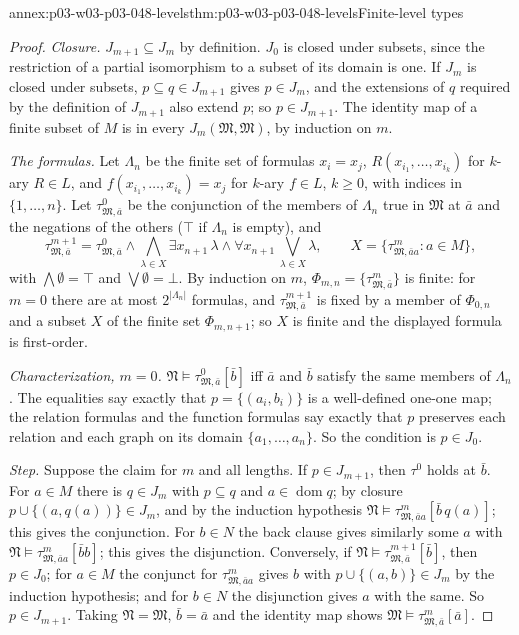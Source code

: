 \begin{annexitem}{annex:p03-w03-p03-048-levels}{thm:p03-w03-p03-048-levels}{Finite-level types}
\begin{proof}
\emph{Closure.}  \(J_{m+1}\subseteq J_m\) by definition.  \(J_0\) is closed
under subsets, since the restriction of a partial isomorphism to a subset of
its domain is one.  If \(J_m\) is closed under subsets, \(p\subseteq q\in
J_{m+1}\) gives \(p\in J_m\), and the extensions of \(q\) required by the
definition of \(J_{m+1}\) also extend \(p\); so \(p\in J_{m+1}\).  The
identity map of a finite subset of \(M\) is in every \(J_m(\mathfrak M,
\mathfrak M)\), by induction on \(m\).

\emph{The formulas.}  Let \(\Lambda_n\) be the finite set of formulas
\(x_i=x_j\), \(R(x_{i_1},\ldots,x_{i_k})\) for \(k\)-ary \(R\in L\), and
\(f(x_{i_1},\ldots,x_{i_k})=x_j\) for \(k\)-ary \(f\in L\), \(k\geq0\), with
indices in \(\{1,\ldots,n\}\).  Let \(\tau^{0}_{\mathfrak M,\bar a}\) be the
conjunction of the members of \(\Lambda_n\) true in \(\mathfrak M\) at
\(\bar a\) and the negations of the others (\(\top\) if \(\Lambda_n\) is
empty), and
\[
\tau^{m+1}_{\mathfrak M,\bar a}=\tau^{0}_{\mathfrak M,\bar a}\land
\bigwedge_{\lambda\in X}\exists x_{n+1}\,\lambda\land\forall x_{n+1}\,
\bigvee_{\lambda\in X}\lambda,\qquad
X=\{\tau^{m}_{\mathfrak M,\bar aa}:a\in M\},
\]
with \(\bigwedge\emptyset=\top\) and \(\bigvee\emptyset=\bot\).  By induction
on \(m\), \(\Phi_{m,n}=\{\tau^{m}_{\mathfrak M,\bar a}\}\) is finite: for
\(m=0\) there are at most \(2^{|\Lambda_n|}\) formulas, and
\(\tau^{m+1}_{\mathfrak M,\bar a}\) is fixed by a member of \(\Phi_{0,n}\) and a
subset \(X\) of the finite set \(\Phi_{m,n+1}\); so \(X\) is finite and the
displayed formula is first-order.

\emph{Characterization, \(m=0\).}  \(\mathfrak N\models\tau^0_{\mathfrak M,
\bar a}[\bar b]\) iff \(\bar a\) and \(\bar b\) satisfy the same members of
\(\Lambda_n\).  The equalities say exactly that \(p=\{(a_i,b_i)\}\) is a
well-defined one-one map; the relation formulas and the function formulas
say exactly that \(p\) preserves each relation and each graph on its domain
\(\{a_1,\ldots,a_n\}\).  So the condition is \(p\in J_0\).

\emph{Step.}  Suppose the claim for \(m\) and all lengths.  If \(p\in
J_{m+1}\), then \(\tau^0\) holds at \(\bar b\).  For \(a\in M\) there is
\(q\in J_m\) with \(p\subseteq q\) and \(a\in\operatorname{dom}q\); by
closure \(p\cup\{(a,q(a))\}\in J_m\), and by the induction hypothesis
\(\mathfrak N\models\tau^{m}_{\mathfrak M,\bar aa}[\bar b\,q(a)]\); this gives
the conjunction.  For \(b\in N\) the back clause gives similarly some \(a\)
with \(\mathfrak N\models\tau^{m}_{\mathfrak M,\bar aa}[\bar bb]\); this gives
the disjunction.  Conversely, if \(\mathfrak N\models\tau^{m+1}_{\mathfrak M,
\bar a}[\bar b]\), then \(p\in J_0\); for \(a\in M\) the conjunct for
\(\tau^m_{\mathfrak M,\bar aa}\) gives \(b\) with \(p\cup\{(a,b)\}\in J_m\) by
the induction hypothesis; and for \(b\in N\) the disjunction gives \(a\) with
the same.  So \(p\in J_{m+1}\).  Taking \(\mathfrak N=\mathfrak M\),
\(\bar b=\bar a\) and the identity map shows
\(\mathfrak M\models\tau^m_{\mathfrak M,\bar a}[\bar a]\).


\end{proof}
\end{annexitem}
